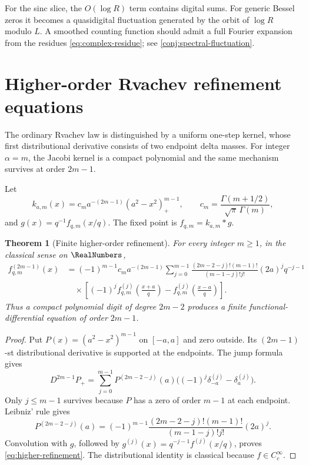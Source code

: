 \documentclass[11pt]{article}
\newtheorem{theorem}{Theorem}[section]
\theoremstyle{definition}
\theoremstyle{remark}
\begin{document}
For the sinc slice, the \(O(\log R)\) term contains digital sums.  For generic
Bessel zeros it becomes a quasidigital fluctuation generated by the orbit of
\(\log R\) modulo \(L\).  A smoothed counting function should admit a full
Fourier expansion from the residues \eqref{eq:complex-residue}; see
\cref{conj:spectral-fluctuation}.

\section{Higher-order Rvachev refinement equations}
\label{sec:higher-refinement}

The ordinary Rvachev law is distinguished by a uniform one-step kernel, whose
first distributional derivative consists of two endpoint delta masses.  For
integer \(\alpha=m\), the Jacobi kernel is a compact polynomial and the same
mechanism survives at order \(2m-1\).

Let
\begin{equation}
 k_{a,m}(x)=c_m a^{-(2m-1)}(a^2-x^2)^{m-1}_+,
 \qquad
 c_m=\frac{\Gamma(m+1/2)}{\sqrt\pi\,\Gamma(m)},
 \label{eq:integer-kernel}
\end{equation}
and \(g(x)=q^{-1}f_{q,m}(x/q)\).  The fixed point is \(f_{q,m}=k_{a,m}*g\).

\begin{theorem}[Finite higher-order refinement]
\label{thm:higher-refinement}
For every integer \(m\ge1\), in the classical sense on \(\RealNumbers\),
\begin{equation}
\boxed{
\begin{aligned}
 f_{q,m}^{(2m-1)}(x)
 &=(-1)^{m-1}c_ma^{-(2m-1)}
 \sum_{j=0}^{m-1}
 \frac{(2m-2-j)!(m-1)!}{(m-1-j)!j!}(2a)^j q^{-j-1}
 \\
 &\quad\times\left[
 (-1)^j f_{q,m}^{(j)}\left(\frac{x+a}{q}\right)
 -f_{q,m}^{(j)}\left(\frac{x-a}{q}\right)
 \right].
\end{aligned}}
 \label{eq:higher-refinement}
\end{equation}
Thus a compact polynomial digit of degree \(2m-2\) produces a finite
functional-differential equation of order \(2m-1\).
\end{theorem}

\begin{proof}
Put \(P(x)=(a^2-x^2)^{m-1}\) on \([-a,a]\) and zero outside.  Its
\((2m-1)\)-st distributional derivative is supported at the endpoints.  The
jump formula gives
\[
 D^{2m-1}P_+
 =\sum_{j=0}^{m-1}P^{(2m-2-j)}(a)
 \bigl((-1)^j\delta_{-a}^{(j)}-\delta_a^{(j)}\bigr).
\]
Only \(j\le m-1\) survives because \(P\) has a zero of order \(m-1\) at
each endpoint.  Leibniz' rule gives
\[
 P^{(2m-2-j)}(a)
 =(-1)^{m-1}
 \frac{(2m-2-j)!(m-1)!}{(m-1-j)!j!}(2a)^j.
\]
Convolution with \(g\), followed by
\(g^{(j)}(x)=q^{-j-1}f^{(j)}(x/q)\), proves
\eqref{eq:higher-refinement}.  The distributional identity is classical
because \(f\in C_c^\infty\).
\end{proof}
\end{document}
